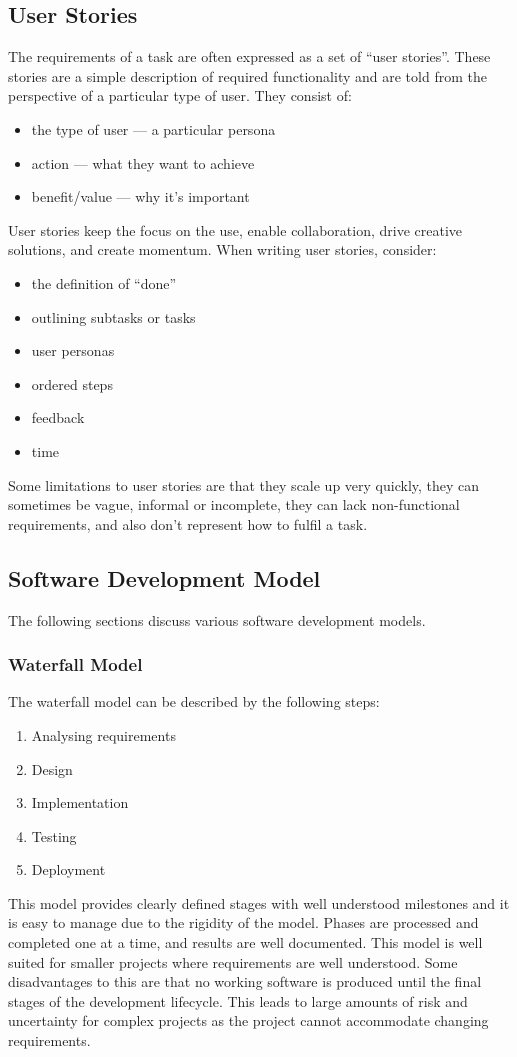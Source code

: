 \documentclass{article}
\begin{document}
\subsection{User Stories}
The requirements of a task are often expressed as a set of ``user
stories''. These stories are a simple description of required
functionality and are told from the perspective of a particular type of
user. They consist of:
\begin{itemize}
    \item the type of user --- a particular persona
    \item action --- what they want to achieve
    \item benefit/value --- why it's important
\end{itemize}
User stories keep the focus on the use, enable collaboration, drive
creative solutions, and create momentum. When writing user stories,
consider:
\begin{itemize}
    \item the definition of ``done''
    \item outlining subtasks or tasks
    \item user personas
    \item ordered steps
    \item feedback
    \item time
\end{itemize}
Some limitations to user stories are that they scale up very quickly, they can sometimes
be vague, informal or incomplete, they can lack non-functional requirements, and also don't
represent how to fulfil a task.
\subsection{Software Development Model}
The following sections discuss various software development models.
\subsubsection{Waterfall Model}
The waterfall model can be described by the following steps:
\begin{enumerate}
    \item Analysing requirements
    \item Design
    \item Implementation
    \item Testing
    \item Deployment
\end{enumerate}
This model provides clearly defined stages with well understood milestones and
it is easy to manage due to the rigidity of the model.
Phases are processed and completed one at a time, and results are well documented.
This model is well suited for smaller projects where requirements are well understood.
Some disadvantages to this are that no working software is produced
until the final stages of the development lifecycle. This leads to
large amounts of risk and uncertainty for complex projects as the
project cannot accommodate changing requirements.
\end{document}
